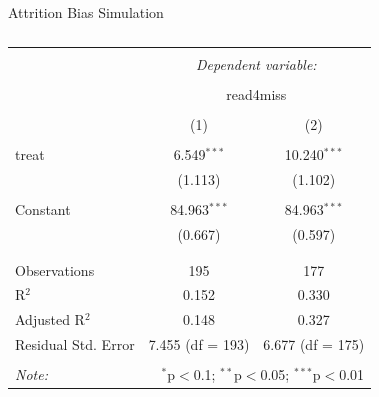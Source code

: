 \documentclass[
  ignorenonframetext,
]{beamer}
\newenvironment{Shaded}{\begin{snugshade}}{\end{snugshade}}
\newcommand{\DataTypeTok}[1]{\textcolor[rgb]{0.13,0.29,0.53}{#1}}
\newcommand{\DecValTok}[1]{\textcolor[rgb]{0.00,0.00,0.81}{#1}}
\newcommand{\KeywordTok}[1]{\textcolor[rgb]{0.13,0.29,0.53}{\textbf{#1}}}
\newcommand{\NormalTok}[1]{#1}
\newcommand{\OperatorTok}[1]{\textcolor[rgb]{0.81,0.36,0.00}{\textbf{#1}}}
\newcommand{\OtherTok}[1]{\textcolor[rgb]{0.56,0.35,0.01}{#1}}
\newcommand{\StringTok}[1]{\textcolor[rgb]{0.31,0.60,0.02}{#1}}
\begin{document}
\begin{frame}[fragile]{Attrition Bias Simulation}
\protect\hypertarget{attrition-bias-simulation-3}{}
\tiny

\begin{Shaded}
\end{Shaded}

\begin{table}[!htbp] \centering 
  \caption{} 
  \label{} 
\begin{tabular}{@{\extracolsep{5pt}}lcc} 
\\[-1.8ex]\hline 
\hline \\[-1.8ex] 
 & \multicolumn{2}{c}{\textit{Dependent variable:}} \\ 
\cline{2-3} 
\\[-1.8ex] & \multicolumn{2}{c}{read4miss} \\ 
\\[-1.8ex] & (1) & (2)\\ 
\hline \\[-1.8ex] 
 treat & 6.549$^{***}$ & 10.240$^{***}$ \\ 
  & (1.113) & (1.102) \\ 
  & & \\ 
 Constant & 84.963$^{***}$ & 84.963$^{***}$ \\ 
  & (0.667) & (0.597) \\ 
  & & \\ 
\hline \\[-1.8ex] 
Observations & 195 & 177 \\ 
R$^{2}$ & 0.152 & 0.330 \\ 
Adjusted R$^{2}$ & 0.148 & 0.327 \\ 
Residual Std. Error & 7.455 (df = 193) & 6.677 (df = 175) \\ 
\hline 
\hline \\[-1.8ex] 
\textit{Note:}  & \multicolumn{2}{r}{$^{*}$p$<$0.1; $^{**}$p$<$0.05; $^{***}$p$<$0.01} \\ 
\end{tabular} 
\end{table}
\end{frame}
\end{document}
